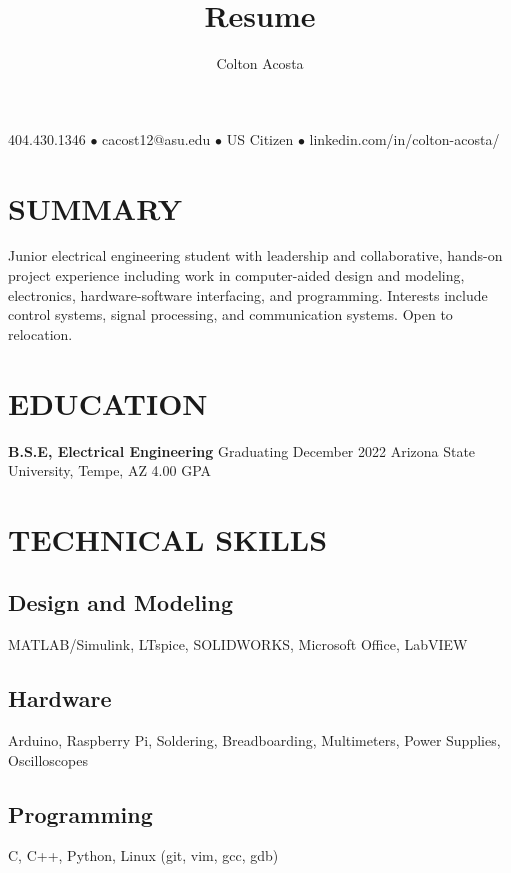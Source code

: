 \documentclass{article}
\makeatletter
\renewcommand{\maketitle}{
	\begin{center}
		{\huge\bfseries
			\theauthor}
			
		404.430.1346 $\bullet$ cacost12@asu.edu $\bullet$ US Citizen $\bullet$ linkedin.com/in/colton-acosta/
	\end{center}
}
\makeatother
\begin{document}
\title{Resume}
\author{Colton Acosta}
\maketitle
\section{SUMMARY}
Junior electrical engineering student with leadership and collaborative, hands-on project experience including work in computer-aided design and modeling, electronics, hardware-software interfacing, and programming. Interests include control systems, signal processing, and communication systems. Open to relocation.
\section{EDUCATION}
\textbf{B.S.E, Electrical Engineering}
\hfill 
Graduating December 2022
\linebreak
Arizona State University, Tempe, AZ 
\hfill
4.00 GPA

\section{TECHNICAL SKILLS}
\subsection{Design and Modeling}
MATLAB/Simulink, LTspice, SOLIDWORKS, Microsoft Office, LabVIEW
\subsection{Hardware}
Arduino, Raspberry Pi, Soldering, Breadboarding,  Multimeters, Power Supplies, Oscilloscopes
\subsection{Programming} 
C, C++, Python, Linux (git, vim, gcc, gdb)
\end{document}
